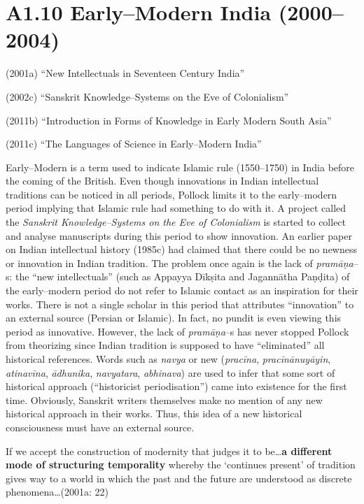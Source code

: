 \section*{A1.10 Early–Modern India (2000–2004)}

\vspace {-.2cm}

(2001a) “New Intellectuals in Seventeen Century India”

(2002c) “Sanskrit Knowledge–Systems on the Eve of Colonialism”

(2011b) “Introduction in Forms of Knowledge in Early Modern South Asia”

(2011c) “The Languages of Science in Early–Modern India”

Early–Modern is a term used to indicate Islamic rule (1550–1750) in India before the coming of the British. Even though innovations in Indian intellectual traditions can be noticed in all periods, Pollock limits it to the early–modern period implying that Islamic rule had something to do with it. A project called the \textit{Sanskrit Knowledge–Systems on the Eve of Colonialism} is started to collect and analyse manuscripts during this period to show innovation. An earlier paper on Indian intellectual history (1985c) had claimed that there could be no newness or innovation in Indian tradition. The problem once again is the lack of \textit{pramāṇa}–s: the “new intellectuals” (such as Appayya Dīkṣita and Jagannātha Paṇḍita) of the early–modern period do not refer to Islamic contact as an inspiration for their works. There is not a single scholar in this period that attributes “innovation” to an external source (Persian or Islamic). In fact, no pundit is even viewing this period as innovative. However, the lack of \textit{pramāṇa}–s has never stopped Pollock from theorizing since Indian tradition is supposed to have “eliminated” all historical references. Words such as \textit{navya} or new (\textit{pracīna},\textit{ pracīnānuyāyin},\textit{ atinavīna},\textit{ ādhunika},\textit{ navyatara},\textit{ abhinava}) are used to infer that some sort of historical approach (“historicist periodisation”) came into existence for the first time. Obviously, Sanskrit writers themselves make no mention of any new historical approach in their works. Thus, this idea of a new historical consciousness must have an external source.

\begin{myquote}
If we accept the construction of modernity that judges it to be…\textbf{a different mode of structuring temporality} whereby the ‘continues present’ of tradition gives way to a world in which the past and the future are understood as discrete phenomena…(2001a: 22)
\end{myquote}

